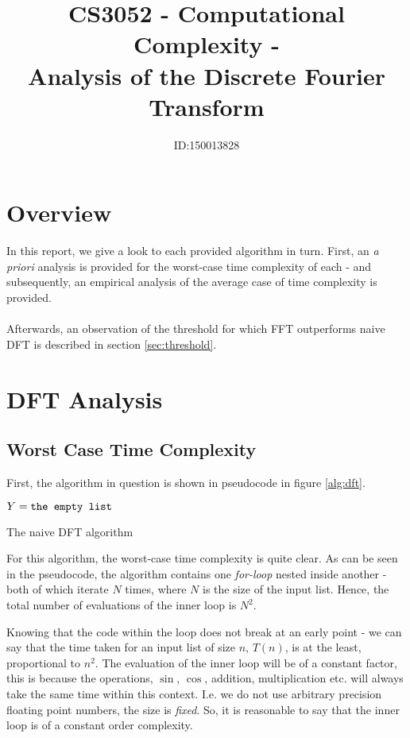 \documentclass[]{article}
\title{CS3052 - Computational Complexity -\\Analysis of the Discrete Fourier Transform}
\author{ID:150013828}
\begin{document}
\maketitle

\section{Overview}
In this report, we give a look to each provided algorithm in turn. First, an \emph{a priori} analysis is provided for the worst-case time complexity of each - and subsequently, an empirical analysis of the average case of time complexity is provided.
\\\\
Afterwards, an observation of the threshold for which FFT outperforms naive DFT is described in section \ref{sec:threshold}.
\section{DFT Analysis}\label{sec:dft}
\subsection{Worst Case Time Complexity}
First, the algorithm in question is shown in pseudocode in figure \ref{alg:dft}.
\begin{algorithm}[h]
	$Y = \verb|the empty list|$\\
\caption{The naive DFT algorithm\label{alg:dft}}
\end{algorithm}

For this algorithm, the worst-case time complexity is quite clear. As can be seen in the pseudocode, the algorithm contains one \emph{for-loop} nested inside another - both of which iterate $N$ times, where $N$ is the size of the input list. Hence, the total number of evaluations of the inner loop is $N^2$.
	
Knowing that the code within the loop does not break at an early point - we can say that the time taken for an input list of size $n$, $T(n)$, is at the least, proportional to $n^2$. The evaluation of the inner loop will be of a constant factor, this is because the operations, $\sin$, $\cos$, addition, multiplication etc. will always take the same time within this context. I.e. we do not use arbitrary precision floating point numbers, the size is \emph{fixed}. So, it is reasonable to say that the inner loop is of a constant order complexity.
\end{document}
